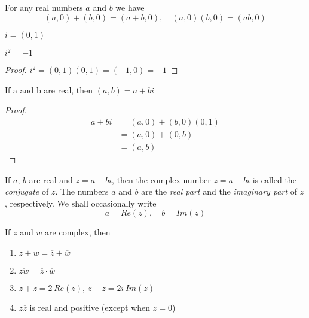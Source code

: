 \documentclass[../poma-notes.tex]{subfiles}
\begin{document}
\begin{theorem}
  For any real numbers $a$ and $b$ we have
  \[(a,0) + (b,0) = (a+b,0), \quad (a,0)(b,0) = (ab,0)\]
\end{theorem}

\begin{definition}
  $i=(0,1)$
\end{definition}

\setcounter{poma}{27}
\begin{theorem}
  $i^2=-1$
\end{theorem}

\begin{proof}
  $i^2 = (0,1)(0,1) = (-1,0) = -1$
\end{proof}

\begin{theorem}
  If a and b are real, then $(a,b)=a+bi$
\end{theorem}

\begin{proof}
  \vspace{-26pt}
  \begin{align*}
    \mathcal{} a+bi & = (a,0) + (b,0)(0,1) \\
                    & = (a,0) + (0,b)      \\
                    & = (a,b)
  \end{align*}
\end{proof}

\begin{definition}
  If $a$, $b$ are real and $z=a+bi$, then the complex number $\overline{z}=a-bi$ is called the \textit{conjugate} of $z$.
  The numbers $a$ and $b$ are the \textit{real part} and the \textit{imaginary part} of $z$, respectively.
  We shall occasionally write
  \[ a = Re(z),\quad b=Im(z)\]
\end{definition}

\begin{theorem}
  If $z$ and $w$ are complex, then
  \begin{enumerate}[label=(\alph*)]
    \item $\overline{z + w} = \overline{z} + \overline{w}$
    \item $\overline{zw} = \overline{z} \cdot \overline{w}$
    \item $z + \overline{z} = 2 \, Re(z), \, z - \overline{z} = 2i \, Im(z)$
    \item $z\overline{z}$ is real and positive (except when $z=0$)
  \end{enumerate}
\end{theorem}
\end{document}
